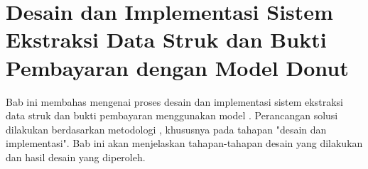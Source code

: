 \chapter{Desain dan Implementasi Sistem Ekstraksi Data Struk dan Bukti Pembayaran dengan Model Donut}
\label{chapter:desain-implementasi}
Bab ini membahas mengenai proses desain dan implementasi sistem ekstraksi data struk dan bukti pembayaran menggunakan model \donut. Perancangan solusi dilakukan berdasarkan metodologi \dsrm, khususnya pada tahapan "desain dan implementasi". Bab ini akan menjelaskan tahapan-tahapan desain yang dilakukan dan hasil desain yang diperoleh.





